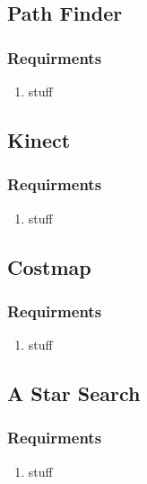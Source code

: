 \subsection{Path Finder}

     \subsubsection{Requirments}
     \begin{enumerate}
       \item stuff
     \end{enumerate}
 
\subsection{Kinect}

  \subsubsection{Requirments}
  \begin{enumerate}
    \item stuff
  \end{enumerate}

\subsection{Costmap}

  \subsubsection{Requirments}
  \begin{enumerate}
    \item stuff
  \end{enumerate}
       

\subsection{A Star Search}

   \subsubsection{Requirments}
   \begin{enumerate}
     \item stuff
   \end{enumerate}

